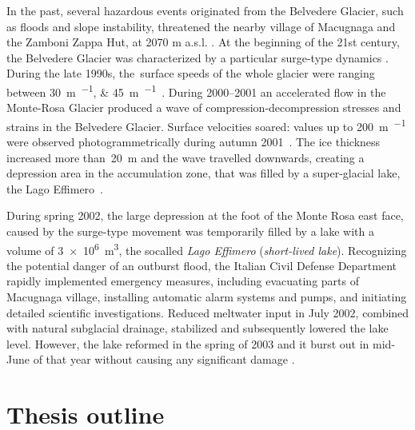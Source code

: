 In the past, several hazardous events originated from the Belvedere Glacier, such as floods
and slope instability, threatened the nearby village of Macugnaga and the Zamboni Zappa
Hut, at 2070 m a.s.l. \citep{Kaab2004}.
At the beginning of the 21st century, the Belvedere Glacier was characterized by a
particular surge-type dynamics  \citep{Haeberli2002}.
During the late 1990s, the~surface speeds of the whole glacier were ranging between
\SIlist{30;45}{\meter\per\year}~\citep{Roethlisberger1985, Kaab2005}.
During 2000--2001 an accelerated flow in the Monte-Rosa Glacier produced a wave of
compression-decompression stresses and strains in the Belvedere Glacier.
Surface velocities soared: values up to \SI{200}{\meter\per\year} were observed
photogrammetrically during autumn 2001~\citep{Kaab2004}.
The ice thickness increased more than~\SI{20}{\meter} and the wave travelled downwards,
creating a depression area in the accumulation zone, that was filled by a super-glacial
lake, the Lago Effimero~\citep{Haeberli2002, Mortara2009}.

During spring 2002, the large depression at the foot of the Monte Rosa east face, caused by the 
surge-type movement was temporarily filled by a lake with a volume of \SI{3e6}{\cubic\meter}, 
the socalled \textit{Lago Effimero} (\textit{short-lived lake}).
Recognizing the potential danger of an outburst flood, the Italian Civil Defense Department rapidly 
implemented emergency measures, including evacuating parts of Macugnaga village, installing automatic 
alarm systems and pumps, and initiating detailed scientific investigations. 
Reduced meltwater input in July 2002, combined with natural subglacial drainage, stabilized and subsequently 
lowered the lake level.
However, the lake reformed in the spring of 2003 and it burst out in mid-June of that year without causing 
any significant damage \citep{Kaab2004}.



\section{Thesis outline}

\makechapterbibliography{}